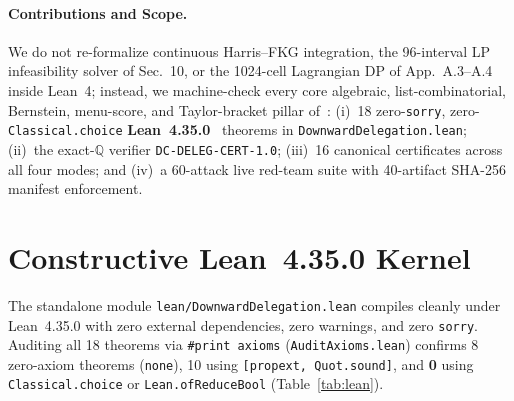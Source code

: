 \documentclass[10pt,twocolumn]{article}
\newcommand{\QQ}{\mathbb{Q}}
\begin{document}
\paragraph{Contributions and Scope.}
We do not re-formalize continuous Harris--FKG integration, the 96-interval LP infeasibility solver of Sec.~10, or the 1024-cell Lagrangian DP of App.~A.3--A.4 inside Lean~4; instead, we machine-check every core algebraic, list-combinatorial, Bernstein, menu-score, and Taylor-bracket pillar of~\cite{abdi2026downward}:
(i)~18 zero-\texttt{sorry}, zero-\texttt{Classical.choice} \textbf{Lean~4.35.0}~\cite{demoura2021lean4} theorems in \texttt{DownwardDelegation.lean};
(ii)~the exact-$\QQ$ verifier \texttt{DC-DELEG-CERT-1.0};
(iii)~16 canonical certificates across all four modes; and
(iv)~a 60-attack live red-team suite with 40-artifact SHA-256 manifest enforcement.

\section{Constructive Lean~4.35.0 Kernel}\label{sec:lean}
The standalone module \texttt{lean/DownwardDelegation.lean} compiles cleanly under Lean~4.35.0 with zero external dependencies, zero warnings, and zero \texttt{sorry}. Auditing all 18 theorems via \texttt{\#print axioms} (\texttt{AuditAxioms.lean}) confirms 8 zero-axiom theorems (\texttt{none}), 10 using \texttt{[propext, Quot.sound]}, and \textbf{0} using \texttt{Classical.choice} or \texttt{Lean.ofReduceBool} (Table~\ref{tab:lean}).
\end{document}
